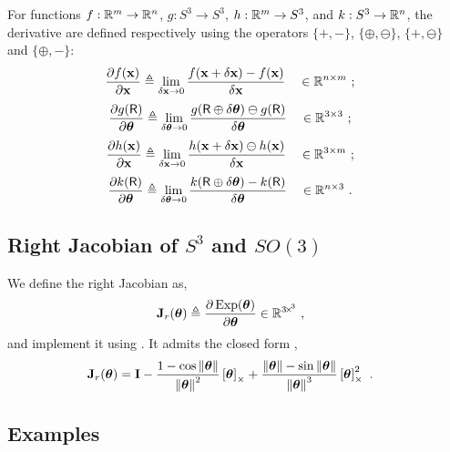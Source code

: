 For functions $f:{\mathbb R}^m\to{\mathbb R}^n$, $g:S^3\to S^3$, $h:{\mathbb R}^m \to S^3$, and $k:S^3\to{\mathbb R}^n$, the derivative are defined respectively using the operators $\{+,-\}$, $\{\oplus,\ominus\}$, $\{+,\ominus\}$ and $\{\oplus,-\}$:
%
\begin{align}\label{equ:derivative_vector}
\frac{\partial f({\bf x})}{\partial{\bf x}} &\triangleq \lim_{\delta{\bf x}\to0}\frac{f({\bf x}+\delta{\bf x})-f({\bf x})}{\delta{\bf x}} &&\in {\mathbb R}^{n\times m} 
~;
\end{align}
%
%
\begin{align}\label{equ:derivative_SO3}
\frac{\partial g(\mathsf R)}{\partial{{\bm \theta}}} 
&\triangleq \lim_{\delta{{\bm \theta}}\to0}\frac{g(\mathsf R\oplus\delta{{\bm \theta}})\ominus g(\mathsf R)}{\delta{{\bm \theta}}}  && \in {\mathbb R}^{3\times 3}
~;
\end{align}
%
%
\begin{align}\label{equ:dif_RtoSO3}
\frac{\partial h({\bf x})}{\partial{\bf x}} &\triangleq \lim_{\delta{\bf x}\to0} \frac{ h({\bf x}+\delta{\bf x})\ominus h({\bf x})}{\delta{\bf x}} && \in {\mathbb R}^{3\times m} 
~;
\end{align}
%
%
\begin{align}\label{equ:jacobian_SO3_Rn}
\frac{\partial k(\mathsf R)}{\partial{{\bm \theta}}} &\triangleq \lim_{\delta{{\bm \theta}}\to0} \frac{k(\mathsf R\oplus\delta{{\bm \theta}}) - k(\mathsf R)}{\delta{{\bm \theta}}} && \in {\mathbb R}^{n\times 3} 
~.
\end{align}

\subsection{Right Jacobian of $S^3$ and $SO(3)$}

We define the right Jacobian as, 
%
\begin{align}\label{equ:Jr}
{\bf J}_r({{\bm \theta}}) &\triangleq \frac{\partial\operatorname*{Exp}({{\bm \theta}})}{\partial{{\bm \theta}}} 
\in{\mathbb R}^{3\!\times\!^3}
~,
\end{align}
%
and implement it using .
It admits the closed form  \cite[pag.~40]{CHIRIKJIAN-12}, 
%
\begin{align}
{\bf J}_r({{\bm \theta}}) &= {\bf I} - \frac{1-\cos{\left\|{{\bm \theta}}\right\|}}{{\left\|{{\bm \theta}}\right\|}^2}\left[{{\bm \theta}}\right]_\times + \frac{{\left\|{{\bm \theta}}\right\|}-\sin{\left\|{{\bm \theta}}\right\|}}{{\left\|{{\bm \theta}}\right\|}^3}\left[{{\bm \theta}}\right]_\times^2 
~.
\end{align}



\subsection{Examples}

